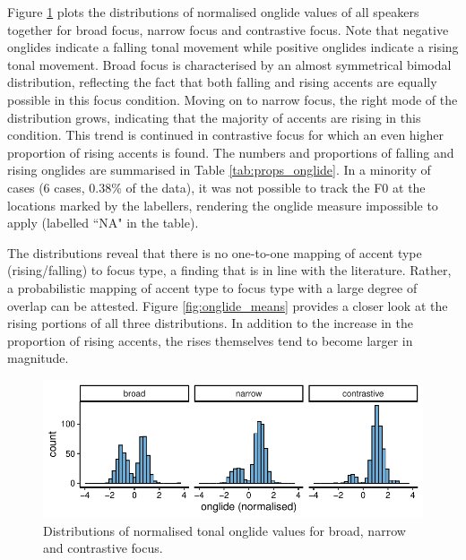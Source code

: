 Figure \ref{fig:onglide_distributions_within} plots the distributions of normalised onglide values of all speakers together for broad focus, narrow focus and contrastive focus. Note that negative onglides indicate a falling tonal movement while positive onglides indicate a rising tonal movement. Broad focus is characterised by an almost symmetrical bimodal distribution, reflecting the fact that both falling and rising accents are equally possible in this focus condition. Moving on to narrow focus, the right mode of the distribution grows, indicating that the majority of accents are rising in this condition. This trend is continued in contrastive focus for which an even higher proportion of rising accents is found. The numbers and proportions of falling and rising onglides are summarised in Table \ref{tab:props_onglide}. In a minority of cases (6 cases, 0.38\% of the data), it was not possible to track the F0 at the locations marked by the labellers, rendering the onglide measure impossible to apply (labelled ``NA" in the table). 

The distributions reveal that there is no one-to-one mapping of accent type (rising/falling) to focus type, a finding that is in line with the literature. Rather, a probabilistic mapping of accent type to focus type with a large degree of overlap can be attested. Figure \ref{fig:onglide_means} provides a closer look at the rising portions of all three distributions. In addition to the increase in the proportion of rising accents, the rises themselves tend to become larger in magnitude. 

\begin{figure}[htbp]
\begin{center}
\includegraphics[width=\textwidth]{figures/ch6/onglide_norm_distribution_within.pdf}
\caption{Distributions of normalised tonal onglide values for broad, narrow and contrastive focus.}
\label{fig:onglide_distributions_within}
\end{center}
\end{figure}

